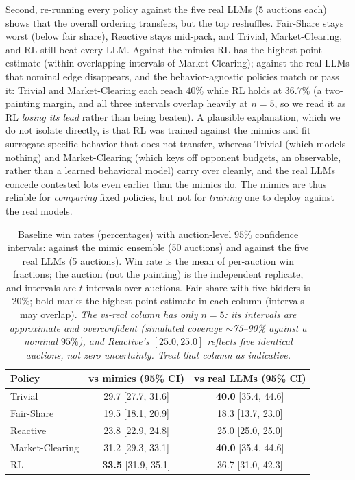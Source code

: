 \documentclass[conference]{IEEEtran}
\begin{document}
Second, re-running every policy against the five real LLMs (5 auctions each) shows that the overall ordering transfers, but the top reshuffles. Fair-Share stays worst (below fair share), Reactive stays mid-pack, and Trivial, Market-Clearing, and RL still beat every LLM. Against the mimics RL has the highest point estimate (within overlapping intervals of Market-Clearing); against the real LLMs that nominal edge disappears, and the behavior-agnostic policies match or pass it: Trivial and Market-Clearing each reach $40\%$ while RL holds at $36.7\%$ (a two-painting margin, and all three intervals overlap heavily at $n=5$, so we read it as RL \emph{losing its lead} rather than being beaten). A plausible explanation, which we do not isolate directly, is that RL was trained against the mimics and fit surrogate-specific behavior that does not transfer, whereas Trivial (which models nothing) and Market-Clearing (which keys off opponent budgets, an observable, rather than a learned behavioral model) carry over cleanly, and the real LLMs concede contested lots even earlier than the mimics do. The mimics are thus reliable for \emph{comparing} fixed policies, but not for \emph{training} one to deploy against the real models.

\begin{table}[htbp]
\caption{Baseline win rates (percentages) with auction-level $95\%$ confidence intervals: against the mimic ensemble (50 auctions) and against the five real LLMs (5 auctions). Win rate is the mean of per-auction win fractions; the auction (not the painting) is the independent replicate, and intervals are $t$ intervals over auctions. Fair share with five bidders is $20\%$; bold marks the highest point estimate in each column (intervals may overlap). \emph{The vs-real column has only $n=5$: its intervals are approximate and overconfident (simulated coverage $\sim$75--90\% against a nominal $95\%$), and Reactive's $[25.0,25.0]$ reflects five identical auctions, not zero uncertainty. Treat that column as indicative.}}
\label{tab:math_results}
\centering
\begin{tabular}{lcc}
\hline
Policy & vs mimics (95\% CI) & vs real LLMs (95\% CI) \\
\hline
Trivial          & 29.7 [27.7, 31.6] & \textbf{40.0} [35.4, 44.6] \\
Fair-Share       & 19.5 [18.1, 20.9] & 18.3 [13.7, 23.0] \\
Reactive         & 23.8 [22.9, 24.8] & 25.0 [25.0, 25.0] \\
Market-Clearing  & 31.2 [29.3, 33.1] & \textbf{40.0} [35.4, 44.6] \\
RL               & \textbf{33.5} [31.9, 35.1] & 36.7 [31.0, 42.3] \\
\hline
\end{tabular}
\end{table}
\end{document}
